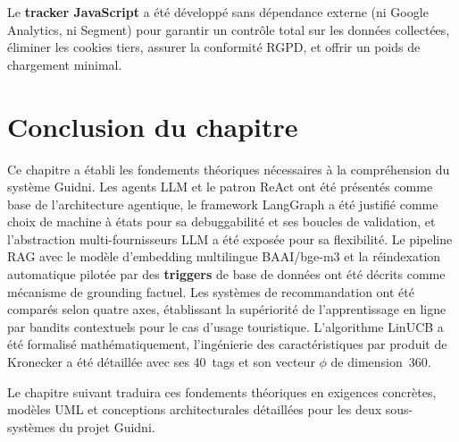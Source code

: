 Le \textbf{tracker JavaScript} a été développé sans dépendance externe (ni Google
Analytics, ni Segment) pour garantir un contrôle total sur les données collectées, éliminer
les cookies tiers, assurer la conformité RGPD, et offrir un poids de chargement minimal.


\section*{Conclusion du chapitre}
Ce chapitre a établi les fondements théoriques nécessaires à la compréhension du système Guidni.
Les agents LLM et le patron ReAct ont été présentés comme base de l'architecture agentique, le
framework LangGraph a été justifié comme choix de machine à états pour sa debuggabilité et ses
boucles de validation, et l'abstraction multi-fournisseurs LLM a été exposée pour sa flexibilité.
Le pipeline RAG avec le modèle d'embedding multilingue BAAI/bge-m3 et la réindexation automatique
pilotée par des \textbf{triggers} de base de données ont été décrits comme mécanisme de grounding 
factuel. Les systèmes de recommandation ont été comparés selon quatre axes, établissant la supériorité 
de l'apprentissage en ligne par bandits contextuels pour le cas d'usage touristique. L'algorithme 
LinUCB a été formalisé mathématiquement, l'ingénierie des caractéristiques par produit de 
Kronecker a été détaillée avec ses 40~tags et son vecteur $\phi$ de dimension~360.

Le chapitre suivant traduira ces fondements théoriques en exigences concrètes, modèles UML et
conceptions architecturales détaillées pour les deux sous-systèmes du projet Guidni.